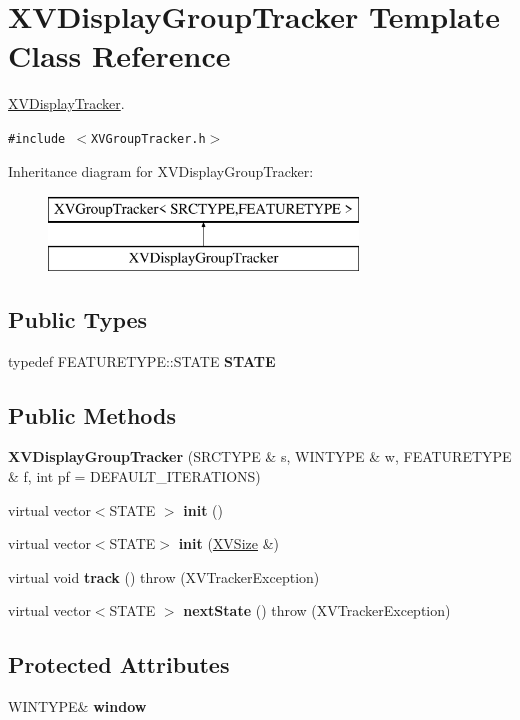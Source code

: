 \hypertarget{class_XVDisplayGroupTracker}{
\section{XVDisplay\-Group\-Tracker  Template Class Reference}
\label{XVDisplayGroupTracker}
}
\hyperlink{class_XVDisplayTracker}{XVDisplay\-Tracker}. 


{\tt \#include $<$XVGroup\-Tracker.h$>$}

Inheritance diagram for XVDisplay\-Group\-Tracker:\begin{figure}[H]
\begin{center}
\leavevmode
\includegraphics[height=2cm]{class_XVDisplayGroupTracker}
\end{center}
\end{figure}
\subsection*{Public Types}
\begin{CompactItemize}
\item 
typedef FEATURETYPE::STATE {\bf STATE}
\end{CompactItemize}
\subsection*{Public Methods}
\begin{CompactItemize}
\item 
{\bf XVDisplay\-Group\-Tracker} (SRCTYPE \& s, WINTYPE \& w, FEATURETYPE \& f, int pf = DEFAULT\_\-ITERATIONS)
\item 
virtual vector$<$STATE $>$ {\bf init} ()
\item 
virtual vector$<$STATE$>$ {\bf init} (\hyperlink{class_XVSize}{XVSize} \&)
\item 
virtual void {\bf track} ()  throw (XVTracker\-Exception)
\item 
virtual vector$<$STATE $>$ {\bf next\-State} ()  throw (XVTracker\-Exception)
\end{CompactItemize}
\subsection*{Protected Attributes}
\begin{CompactItemize}
\item 
WINTYPE\& {\bf window}
\end{CompactItemize}


